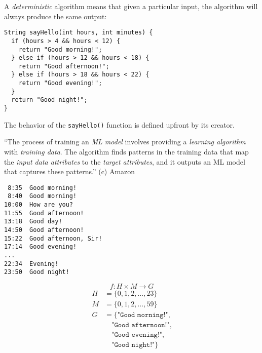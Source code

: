 \documentclass{article}
\begin{document}

\pptToc



A \emph{deterministic} algorithm means that given a particular input, the algorithm will always produce the same output:

{\scriptsize\begin{verbatim}
String sayHello(int hours, int minutes) {
  if (hours > 4 && hours < 12) {
    return "Good morning!";
  } else if (hours > 12 && hours < 18) {
    return "Good afternoon!";
  } else if (hours > 18 && hours < 22) {
    return "Good evening!";
  }
  return "Good night!";
}
\end{verbatim}
}

The behavior of the \texttt{sayHello()} function is defined upfront by its creator.

\plush{}


``The process of training an \emph{ML model} involves providing a \emph{learning algorithm} with \emph{training data}. The algorithm finds patterns in the training data that map the \emph{input data attributes} to the \emph{target attributes}, and it outputs an ML model that captures these patterns.'' (c) Amazon

\begin{multicols}{2}
{\scriptsize\begin{verbatim}
 8:35  Good morning!
 8:40  Good morning!
10:00  How are you?
11:55  Good afternoon!
13:18  Good day!
14:50  Good afternoon!
15:22  Good afternoon, Sir!
17:14  Good evening!
...
22:34  Evening!
23:50  Good night!
\end{verbatim}
}
\par\columnbreak\par
\begin{equation*}
f : H \times M \to G
\end{equation*}
{\scriptsize\begin{equation*}
\begin{split}
H &= \{ 0, 1, 2, \dots, 23 \} \\
M &= \{ 0, 1, 2, \dots, 59 \} \\
G &= \{ \texttt{"Good morning!"}, \\
  & \quad\texttt{"Good afternoon!"}, \\
  & \quad\texttt{"Good evening!"}, \\
  & \quad\texttt{"Good night!"} \} \\
\end{split}
\end{equation*}}
\end{multicols}
\end{document}
